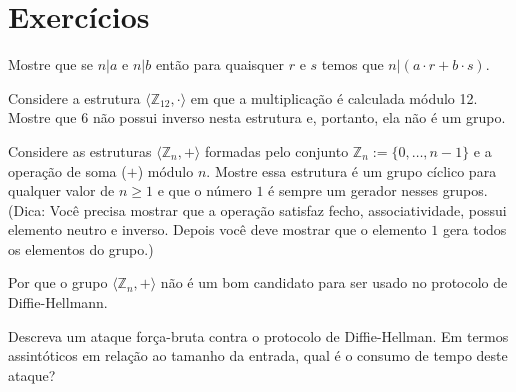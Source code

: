 \section{Exercícios}

\begin{exercicio}
  Mostre que se $n|a$ e $n|b$ então para quaisquer $r$ e $s$ temos que $n|(a \cdot r + b \cdot s)$.
\end{exercicio}

\begin{exercicio}
\label{ex:grupo}
  Considere a estrutura $\langle \mathbb{Z}_{12}, \cdot \rangle$ em que a multiplicação é calculada módulo 12.
Mostre que $6$ não possui inverso nesta estrutura e, portanto, ela não é um grupo.
\end{exercicio}

\begin{exercicio}
  Considere as estruturas $\langle \mathbb{Z}_n, + \rangle$ formadas pelo conjunto $\mathbb{Z}_n := \{0, \dots, n-1\}$ e a operação de soma ($+$) módulo $n$.
  Mostre essa estrutura é um grupo cíclico para qualquer valor de $n \geq 1$ e que o número $1$ é sempre um gerador nesses grupos. (Dica: Você precisa mostrar que a operação satisfaz fecho, associatividade, possui elemento neutro e inverso. Depois você deve mostrar que o elemento $1$ gera todos os elementos do grupo.)

  Por que o grupo $\langle \mathbb{Z}_n, +\rangle$ não é um bom candidato para ser usado no protocolo de Diffie-Hellmann.
\end{exercicio}

\begin{exercicio}
  Descreva um ataque força-bruta contra o protocolo de Diffie-Hellman.
  Em termos assintóticos em relação ao tamanho da entrada, qual é o consumo de tempo deste ataque?
\end{exercicio}
